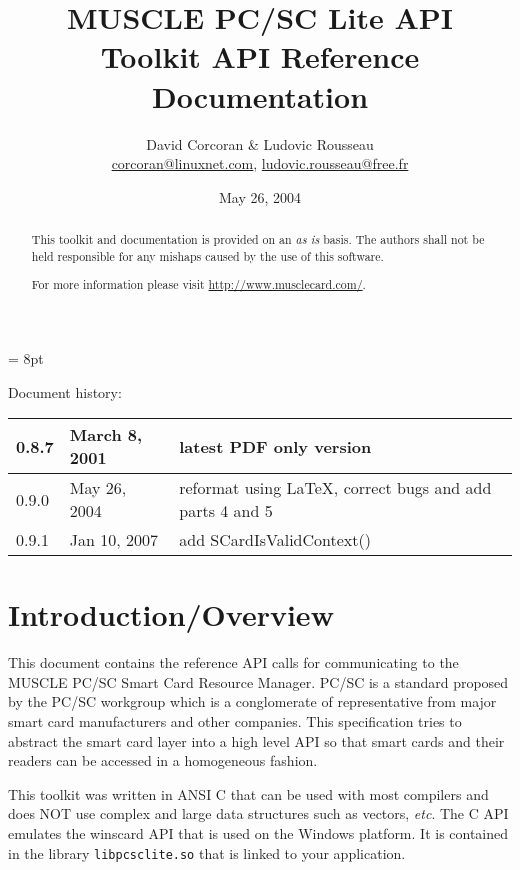 \documentclass[a4paper,12pt]{article}
\title{MUSCLE PC/SC Lite API \\ Toolkit API Reference Documentation}
\author{David Corcoran \& Ludovic Rousseau\\
\url{corcoran@linuxnet.com}, \url{ludovic.rousseau@free.fr}}
\date{May 26, 2004}
\begin{document}
\maketitle

\begin{abstract}
This toolkit and documentation is provided on an \emph{as is} basis.
The authors shall not be held responsible for any mishaps caused by the
use of this software.

For more information please visit \url{http://www.musclecard.com/}.

\end{abstract}

\parskip = 8pt

\addtolength{\parindent}{-\parindent}

Document history: \\
\begin{tabular}{|l|l|l|}
\hline
0.8.7 & March 8, 2001 & latest PDF only version \\
\hline
0.9.0 & May 26, 2004 & reformat using \LaTeX{}, correct bugs and add
parts 4 and 5 \\
\hline
0.9.1 & Jan 10, 2007 & add SCardIsValidContext() \\
\hline
\end{tabular}

\newpage
\tableofcontents
\newpage

\section{Introduction/Overview}

This document contains the reference API calls for communicating to the
MUSCLE PC/SC Smart Card Resource Manager. PC/SC is a standard proposed by
the PC/SC workgroup \cite{pcsc_workgroup} which is a conglomerate of
representative from major smart card manufacturers and other companies.
This specification tries to abstract the smart card layer into a high
level API so that smart cards and their readers can be accessed in a
homogeneous fashion.

This toolkit was written in ANSI C that can be used with most compilers
and does NOT use complex and large data structures such as vectors,
\textit{etc}.  The C API emulates the winscard API that is used on the
Windows platform. It is contained in the library \texttt{libpcsclite.so}
that is linked to your application.
\end{document}
